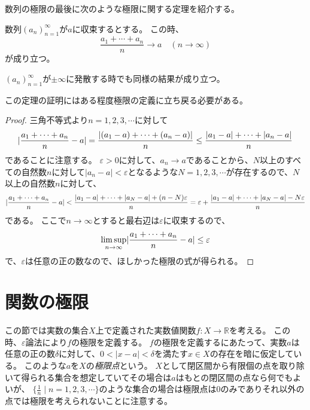 数列の極限の最後に次のような極限に関する定理を紹介する。

\begin{theorem}
数列$(a_n)_{n = 1}^\infty$が$a$に収束するとする。
この時、
$$
\frac{a_1+\cdots+a_n}{n} \to a \quad (n \to \infty)
$$
が成り立つ。
\end{theorem}

\begin{remark}
$(a_n)_{n = 1}^\infty$が$\pm \infty$に発散する時でも同様の結果が成り立つ。
\end{remark}

この定理の証明にはある程度極限の定義に立ち戻る必要がある。

\begin{proof}
三角不等式より$n = 1, 2, 3, \cdots$に対して
$$
\lvert\frac{a_1+\cdots+a_n}{n}-a\rvert = \frac{|(a_1-a)+\cdots+(a_n-a)|}{n} \le \frac{|a_1-a|+\cdots+|a_n-a|}{n}
$$
であることに注意する。
$\varepsilon > 0$に対して、$a_n \to a$であることから、$N$以上のすべての自然数$n$に対して$|a_n-a| < \varepsilon$となるような$N = 1, 2, 3, \cdots$が存在するので、$N$以上の自然数$n$に対して、
$$
\lvert\frac{a_1+\cdots+a_n}{n}-a\rvert
< \frac{|a_1-a|+\cdots+|a_N-a|+(n-N)\varepsilon}{n}
= \varepsilon+\frac{|a_1-a|+\cdots+|a_N-a|-N\varepsilon}{n}
$$
である。
ここで$n \to \infty$とすると最右辺は$\varepsilon$に収束するので、
$$
\limsup_{n \to \infty}\lvert\frac{a_1+\cdots+a_n}{n}-a\rvert \le \varepsilon
$$
で、$\varepsilon$は任意の正の数なので、ほしかった極限の式が得られる。
\end{proof}

\section{関数の極限}

この節では実数の集合$X$上で定義された実数値関数$f: X \to \mathbb{R}$を考える。
この時、$\varepsilon$論法により$f$の極限を定義する。
$f$の極限を定義するにあたって、実数$a$は任意の正の数$\delta$に対して、$0 < |x-a| < \delta$を満たす$x \in X$の存在を暗に仮定している。
このような$a$を$X$の\emph{極限点}という。
$X$として閉区間から有限個の点を取り除いて得られる集合を想定していてその場合は$a$はもとの閉区間の点なら何でもよいが、
$\{ \frac{1}{n} \mid n = 1, 2, 3, \cdots \}$のような集合の場合は極限点は$0$のみでありそれ以外の点では極限を考えられないことに注意する。

